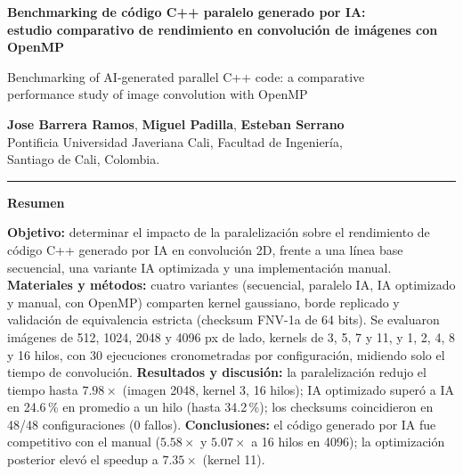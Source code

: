 \documentclass[12pt]{article}
\begin{document}
\begin{center}
  {\LARGE\bfseries Benchmarking de código C++ paralelo generado por IA:\\[2pt]
   estudio comparativo de rendimiento en convolución de imágenes con OpenMP\par}
  \vspace{6pt}
  {\large Benchmarking of AI-generated parallel C++ code: a comparative\\
   performance study of image convolution with OpenMP\par}
\end{center}

\vspace{4pt}
\begin{center}
  \textbf{Jose Barrera Ramos}, \textbf{Miguel Padilla}, \textbf{Esteban Serrano}\\[2pt]
  {\small Pontificia Universidad Javeriana Cali, Facultad de Ingeniería,\\
   Santiago de Cali, Colombia.}
\end{center}

\vspace{6pt}
\hrule
\vspace{8pt}

\noindent\textbf{Resumen}
\vspace{2pt}

\noindent\textbf{Objetivo:} determinar el impacto de la paralelización sobre el
rendimiento de código C++ generado por IA en convolución 2D, frente a una línea
base secuencial, una variante IA optimizada y una implementación manual.
\textbf{Materiales y métodos:} cuatro variantes (secuencial, paralelo IA, IA
optimizado y manual, con OpenMP) comparten kernel gaussiano, borde replicado y
validación de equivalencia estricta (checksum FNV-1a de 64 bits). Se evaluaron
imágenes de 512, 1024, 2048 y 4096 px de lado, kernels de 3, 5, 7 y 11, y 1, 2, 4,
8 y 16 hilos, con 30 ejecuciones cronometradas por configuración, midiendo solo el
tiempo de convolución.
\textbf{Resultados y discusión:} la paralelización redujo el tiempo hasta
$7.98\times$ (imagen 2048, kernel 3, 16 hilos); IA optimizado superó a IA en
24.6\,\% en promedio a un hilo (hasta 34.2\,\%); los checksums coincidieron en
48/48 configuraciones (0 fallos).
\textbf{Conclusiones:} el código generado por IA fue competitivo con el manual
($5.58\times$ y $5.07\times$ a 16 hilos en 4096); la optimización posterior elevó
el speedup a $7.35\times$ (kernel 11).
\end{document}

